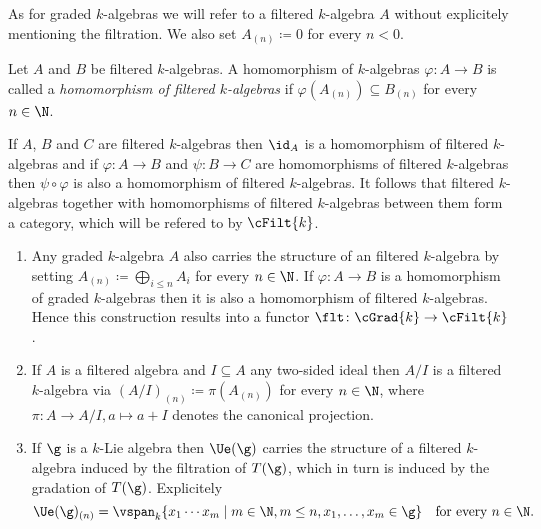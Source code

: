 \begin{remark}
 As for graded $k$-algebras we will refer to a filtered $k$-algebra $A$ without explicitely mentioning the filtration. We also set $A_{(n)} \coloneqq 0$ for every $n < 0$.
\end{remark}


\begin{definition}
 Let $A$ and $B$ be filtered $k$-algebras. A homomorphism of $k$-algebras $\varphi \colon A \to B$ is called a \emph{homomorphism of filtered $k$-algebras} if $\varphi(A_{(n)}) \subseteq B_{(n)}$ for every $n \in \N$.
\end{definition}


\begin{remark}
 If $A$, $B$ and $C$ are filtered $k$-algebras then $\id_A$ is a homomorphism of filtered $k$-algebras and if $\varphi \colon A \to B$ and $\psi \colon B \to C$ are homomorphisms of filtered $k$-algebras then $\psi \circ \varphi$ is also a homomorphism of filtered $k$-algebras. It follows that filtered $k$-algebras together with homomorphisms of filtered $k$-algebras between them form a category, which will be refered to by $\cFilt{k}$.
\end{remark}


\begin{examples}
 \begin{enumerate}[leftmargin=*]
  \item
   Any graded $k$-algebra $A$ also carries the structure of an filtered $k$-algebra by setting $A_{(n)} \coloneqq \bigoplus_{i \leq n} A_i$ for every $n \in \N$. If $\varphi \colon A \to B$ is a homomorphism of graded $k$-algebras then it is also a homomorphism of filtered $k$-algebras. Hence this construction results into a functor $\flt \colon \cGrad{k} \to \cFilt{k}$.
  \item 
   If $A$ is a filtered algebra and $I \subseteq A$ any two-sided ideal then $A/I$ is a filtered $k$-algebra via $(A/I)_{(n)} \coloneqq \pi(A_{(n)})$ for every $n \in \N$, where $\pi \colon A \to A/I, a \mapsto a + I$ denotes the canonical projection.
  \item
   If $\g$ is a $k$-Lie algebra then $\Ue(\g)$ carries the structure of a filtered $k$-algebra induced by the filtration of $T(\g)$, which in turn is induced by the gradation of $T(\g)$. Explicitely
   \[
   \Ue(\g)_{(n)}
   = \vspan_k \{x_1 \dotsm x_m \mid m \in \N, m \leq n, x_1, \dotsc, x_m \in \g\}
   \quad\text{for every $n \in \N$}.
   \]
 \end{enumerate}
\end{examples}


